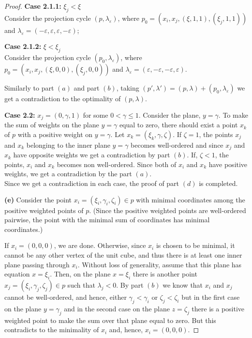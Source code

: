\documentclass[12p]{article}
\numberwithin{equation}{section}
\begin{document}
\begin{proof}
    \textbf{Case 2.1.1:} \(\xi_j < \xi\)\\
    Consider the projection cycle \((p, \lambda_\varepsilon)\), where \(p_0=(x_i, x_j, (\xi,1,1), (\xi_j,1,1))\) and \(\lambda_\varepsilon=(-\varepsilon,\varepsilon,\varepsilon,-\varepsilon)\);
    
    \textbf{Case 2.1.2:} \(\xi < \xi_j\)\\
    Consider the projection cycle \((p_0, \lambda_\varepsilon)\), where \(p_0=(x_i, x_j, (\xi,0,0), (\xi_j,0,0))\) and \(\lambda_\varepsilon=(\varepsilon,-\varepsilon,-\varepsilon,\varepsilon)\).

    Similarly to part \((a)\) and part \((b)\), taking \((p',\lambda')=(p,\lambda)+(p_0,\lambda_\varepsilon)\) we get a contradiction to the optimality of \((p,\lambda)\).
    
    \textbf{Case 2.2:} \(x_j=(0,\gamma,1)\) for some \(0 < \gamma \le 1\). 
    Consider the plane, \(y=\gamma\). To make the sum of weights on the plane \(y=\gamma\) equal to zero, there should exist a point \(x_k\) of \(p\) with a positive weight on \(y=\gamma\). Let \(x_k=(\xi_k,\gamma,\zeta)\). If \(\zeta=1\), the points \(x_j\) and \(x_k\) belonging to the inner plane \(y=\gamma\) becomes well-ordered and since \(x_j\) and \(x_k\) have opposite weights we get a contradiction by part \((b)\). If, \(\zeta<1\), the points, \(x_i\) and \(x_k\) becomes non well-ordered. Since both of \(x_i\) and \(x_k\) have positive weights, we get a contradiction by the part \((a)\).
    \\
    Since we get a contradiction in each case, the proof of part \((d)\) is completed.


\textbf{(e)} 
    Consider the point \(x_i=(\xi_i,\gamma_i,\zeta_i)\in p\) with minimal coordinates among the positive weighted points of \(p\). (Since the positive weighted points are well-ordered pairwise, the point with the minimal sum of coordinates has minimal coordinates.) 
    
    If \(x_i=(0,0,0)\), we are done. Otherwise, since \(x_i\) is chosen to be minimal, it cannot be any other vertex of the unit cube, and thus there is at least one inner plane passing through \(x_i\). 
    Without loss of generality, assume that this plane has equation \(x=\xi_i\). Then, on the plane \(x=\xi_i\) there is another point \(x_j=(\xi_i,\gamma_j,\zeta_j) \in p\) such that \(\lambda_j<0\). By part \((b)\) we know that \(x_i\) and \(x_j\) cannot be well-ordered, and hence, either \(\gamma_j<\gamma_i\) or \(\zeta_j<\zeta_i\) but in the first case on the plane \(y=\gamma_j\) and in the second case on the plane \(z=\zeta_j\) there is a positive weighted point to make the sum over that plane equal to zero. But this contradicts to the minimality of \(x_i\) and, hence, \(x_i=(0,0,0)\).


\end{proof}
\end{document}

